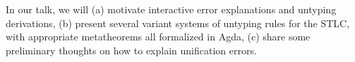 \documentclass[sigplan, screen]{acmart}\settopmatter{printccs=false,printacmref=false}
\begin{document}
In our talk, we will (a) motivate interactive error explanations and
untyping derivations, (b) present several variant systems of untyping
rules for the STLC, with appropriate metatheorems all formalized in
Agda, (c) share some preliminary thoughts on how to explain
unification errors.









\end{document}
